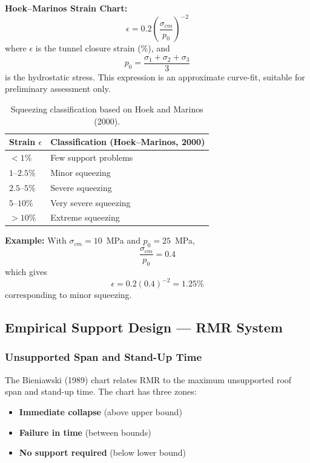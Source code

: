 \documentclass[a4paper,12pt]{article}
\begin{document}
\textbf{Hoek--Marinos Strain Chart:}
\[
\boxed{\epsilon = 0.2\left(\frac{\sigma_{cm}}{p_0}\right)^{-2}}
\]
where $\epsilon$ is the tunnel closure strain (\%), and
\[
p_0 = \frac{\sigma_1+\sigma_2+\sigma_3}{3}
\]
is the hydrostatic stress. This expression is an approximate curve-fit, suitable for preliminary assessment only.

\begin{table}[ht]
\centering
\begin{tabular}{ll}
\toprule
\textbf{Strain $\epsilon$} & \textbf{Classification (Hoek--Marinos, 2000)} \\
\midrule
$<1\%$ & Few support problems \\
$1$--$2.5\%$ & Minor squeezing \\
$2.5$--$5\%$ & Severe squeezing \\
$5$--$10\%$ & Very severe squeezing \\
$>10\%$ & Extreme squeezing \\
\bottomrule
\end{tabular}
\caption{Squeezing classification based on Hoek and Marinos (2000).}
\end{table}

\textbf{Example:} With $\sigma_{cm} = 10$~MPa and $p_0 = 25$~MPa,
\[
\frac{\sigma_{cm}}{p_0}=0.4
\]
which gives
\[
\epsilon = 0.2(0.4)^{-2} = 1.25\%
\]
corresponding to minor squeezing.

\subsection{Empirical Support Design --- RMR System}

\subsubsection{Unsupported Span and Stand-Up Time}
The Bieniawski (1989) chart relates RMR to the maximum unsupported roof span and stand-up time. The chart has three zones:
\begin{itemize}
    \item \textbf{Immediate collapse} (above upper bound)
    \item \textbf{Failure in time} (between bounds)
    \item \textbf{No support required} (below lower bound)
\end{itemize}
\end{document}
